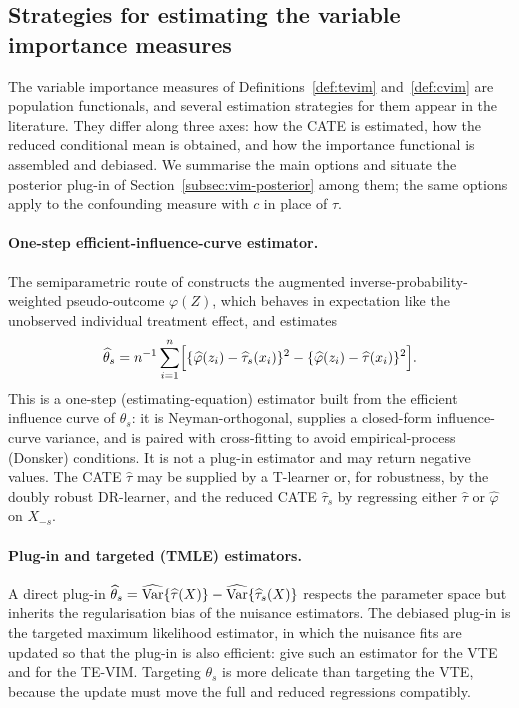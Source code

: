 \subsection{Strategies for estimating the variable importance measures}
\label{subsec:vim-estimation}

The variable importance measures of Definitions~\ref{def:tevim}
and~\ref{def:cvim} are population functionals, and several estimation strategies
for them appear in the literature. They differ along three axes: how the CATE is
estimated, how the reduced conditional mean is obtained, and how the importance
functional is assembled and debiased. We summarise the main options and situate
the posterior plug-in of Section~\ref{subsec:vim-posterior} among them; the same
options apply to the confounding measure with $c$ in place of $\tau$.

\paragraph{One-step efficient-influence-curve estimator.}
The semiparametric route of \citet{hines2022} constructs the augmented
inverse-probability-weighted pseudo-outcome $\varphi(Z)$, which behaves in
expectation like the unobserved individual treatment effect, and estimates
\[
\widehat\theta_s = n^{-1}\sum_{i=1}^n
\Bigl[ \{\widehat\varphi(z_i) - \widehat\tau_s(x_i)\}^2
      - \{\widehat\varphi(z_i) - \widehat\tau(x_i)\}^2 \Bigr].
\]
This is a one-step (estimating-equation) estimator built from the efficient
influence curve of $\theta_s$: it is Neyman-orthogonal, supplies a closed-form
influence-curve variance, and is paired with cross-fitting to avoid
empirical-process (Donsker) conditions. It is not a plug-in estimator and may
return negative values. The CATE $\widehat\tau$ may be supplied by a T-learner
or, for robustness, by the doubly robust DR-learner, and the reduced CATE
$\widehat\tau_s$ by regressing either $\widehat\tau$ or $\widehat\varphi$ on
$X_{-s}$.

\paragraph{Plug-in and targeted (TMLE) estimators.}
A direct plug-in $\widehat\theta_s = \widehat{\mathrm{Var}}\{\widehat\tau(X)\} -
\widehat{\mathrm{Var}}\{\widehat\tau_s(X)\}$ respects the parameter space but inherits
the regularisation bias of the nuisance estimators. The debiased plug-in is the
targeted maximum likelihood estimator, in which the nuisance fits are updated so
that the plug-in is also efficient: \citet{levy2021} give such an estimator for
the VTE and \citet{li2023} for the TE-VIM. Targeting $\theta_s$ is more delicate
than targeting the VTE, because the update must move the full and reduced
regressions compatibly.

